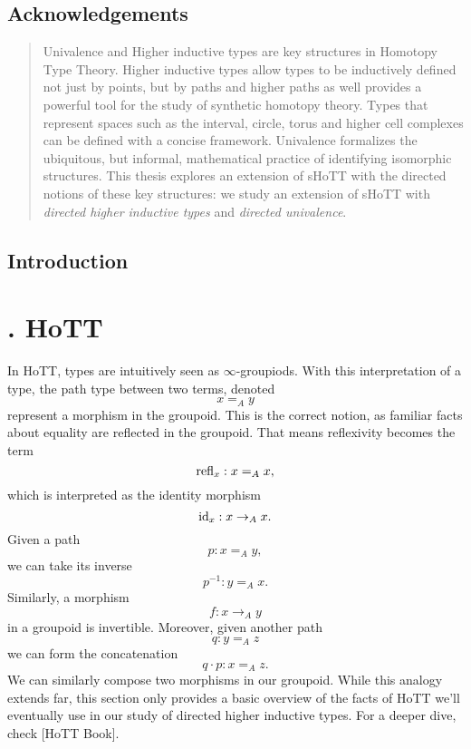 \documentclass{article}
\theoremstyle{named}
\theoremstyle{remark}
\theoremstyle{definition}
\begin{document}
\listoftodos
{}

\subsection*{\centering Acknowledgements}
\newpage
{}

\newpage
\begin{abstract}
    Univalence and Higher inductive types are key structures in Homotopy Type Theory. Higher inductive types allow types to be inductively
     defined not just by points, but by paths and higher paths as well provides a powerful tool for the study of synthetic homotopy theory. 
     Types that represent spaces such as the interval, circle, torus and higher cell complexes can be defined with a concise framework. 
     Univalence formalizes the ubiquitous, but informal, mathematical practice of identifying isomorphic structures. This thesis explores
     an extension of sHoTT with the directed notions of these key structures: we study an extension of sHoTT with \textit{directed higher inductive types}
     and \textit{directed univalence}.
    \end{abstract}
\newpage
\tableofcontents

\newpage 
\subsection*{\centering Introduction}

\newpage
\section*{. HoTT}
In HoTT, types are intuitively seen as $\infty$-groupiods. With this interpretation of a type, the path type between two terms, denoted $$x =_A y$$ represent a morphism in the groupoid. This is the correct notion, as familiar facts about equality are
reflected in the groupoid. That means reflexivity becomes the term $$\text{refl}_{x} : x=_A x,$$ which is interpreted as the identity morphism $$\text{id}_{x} : x \to_A x.$$ Given a path $$p : x =_A y,$$ we can take its inverse $$p^{-1} : y =_A x.$$ Similarly, a morphism $$f : x \to_A y$$ in a groupoid is invertible. Moreover, given another path $$q : y =_A z$$ we can form the concatenation $$q \cdot p : x =_A z.$$ We can similarly compose two morphisms in our groupoid. While this analogy extends far, this section only provides a basic overview of the facts of HoTT we'll eventually use in our study of directed higher inductive types. For a deeper dive, check [HoTT Book]. 
\end{document}
